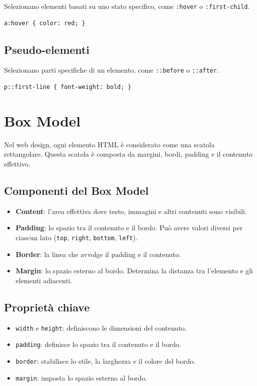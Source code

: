 Selezionano elementi basati su uno stato specifico, come \texttt{:hover} o \texttt{:first-child}.

\begin{lstlisting}[caption=Pseudo-classe]
a:hover { color: red; }
\end{lstlisting}

\subsection{Pseudo-elementi}

Selezionano parti specifiche di un elemento, come \texttt{::before} o \texttt{::after}.

\begin{lstlisting}[caption=Pseudo-elemento]
p::first-line { font-weight: bold; }
\end{lstlisting}

\section{Box Model}

Nel web design, ogni elemento HTML è considerato come una scatola rettangolare. Questa scatola è composta da margini, bordi, padding e il contenuto effettivo.

\subsection{Componenti del Box Model}

\begin{itemize}
    \item \textbf{Content}: l'area effettiva dove testo, immagini e altri contenuti sono visibili.
    \item \textbf{Padding}: lo spazio tra il contenuto e il bordo. Può avere valori diversi per ciascun lato (\texttt{top}, \texttt{right}, \texttt{bottom}, \texttt{left}).
    \item \textbf{Border}: la linea che avvolge il padding e il contenuto.
    \item \textbf{Margin}: lo spazio esterno al bordo. Determina la distanza tra l'elemento e gli elementi adiacenti.
\end{itemize}

\subsection{Proprietà chiave}

\begin{itemize}
    \item \texttt{width} e \texttt{height}: definiscono le dimensioni del contenuto.
    \item \texttt{padding}: definisce lo spazio tra il contenuto e il bordo.
    \item \texttt{border}: stabilisce lo stile, la larghezza e il colore del bordo.
    \item \texttt{margin}: imposta lo spazio esterno al bordo.
\end{itemize}

